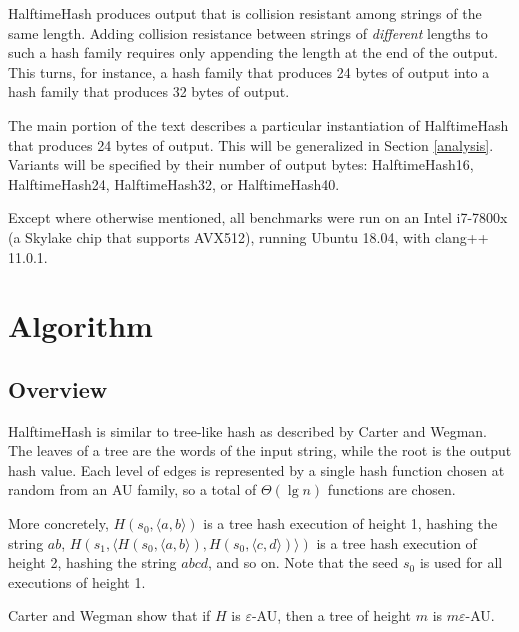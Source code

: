 \documentclass[runningheads]{llncs}
\begin{document}
HalftimeHash produces output that is collision resistant among strings of the same length.
Adding collision resistance between strings of {\em different} lengths to such a hash family requires only appending the length at the end of the output.
This turns, for instance, a hash family that produces 24 bytes of output into a hash family that produces 32 bytes of output.

The main portion of the text describes a particular instantiation of HalftimeHash that produces 24 bytes of output.
This will be generalized in Section \ref{analysis}.
Variants will be specified by their number of output bytes: HalftimeHash16, HalftimeHash24, HalftimeHash32, or HalftimeHash40.

Except where otherwise mentioned, all benchmarks were run on an Intel i7-7800x (a Skylake chip that supports AVX512), running Ubuntu 18.04, with clang++ 11.0.1.



\section{Algorithm}
\label{algo}

\subsection{Overview}

HalftimeHash is similar to tree-like hash as described by Carter and Wegman. \cite[Section 3]{carter-wegman-79}
The leaves of a tree are the words of the input string, while the root is the output hash value.
Each level of edges is represented by a single hash function chosen at random from an AU family, so a total of $\Theta(\lg n)$ functions are chosen.

More concretely, $H(s_0,\langle{}a,b\rangle)$ is a tree hash execution of height 1, hashing the string $ab$, $H(s_1, \langle H(s_0, \langle a,b\rangle), H(s_0, \langle c,d\rangle)\rangle)$ is a tree hash execution of height 2, hashing the string $abcd$, and so on.
Note that the seed $s_0$ is used for all executions of height 1.

Carter and Wegman show that if $H$ is $\varepsilon$-AU, then a tree of height $m$ is $m\varepsilon$-AU.
\end{document}
